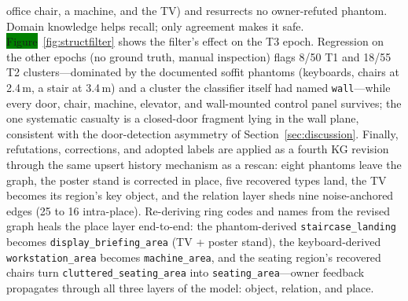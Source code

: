 \documentclass[electronics,article,accept,pdftex,moreauthors]{Definitions/mdpi}
\begin{document}
office chair, a machine, and the TV) and resurrects no owner-refuted
phantom. Domain knowledge helps recall; only agreement makes it safe.
\colorbox{green}{Figure}~\ref{fig:structfilter} shows the filter's effect on the T3 epoch.
Regression on the other epochs (no ground truth, manual inspection)
flags 8/50 T1 and 18/55 T2 clusters---dominated by the documented
soffit phantoms (keyboards, chairs at 2.4\,m, a stair at 3.4\,m) and a
cluster the classifier itself had named \texttt{wall}---while every
door, chair, machine, elevator, and wall-mounted control panel survives;
the one systematic casualty is a closed-door fragment lying in the wall
plane, consistent with the door-detection asymmetry of
Section~\ref{sec:discussion}. Finally, refutations, corrections, and
adopted labels are applied as a fourth KG revision through the same
upsert history mechanism as a rescan: eight phantoms leave the graph,
the poster stand is corrected in place, five recovered types land, the
TV becomes its region's key object, and the relation layer sheds nine
noise-anchored edges (25 to 16 intra-place). Re-deriving ring codes and
names from the revised graph heals the place layer end-to-end: the
phantom-derived \texttt{staircase\_landing} becomes
\texttt{display\_briefing\_area} (TV + poster stand), the
keyboard-derived \texttt{workstation\_area} becomes
\texttt{machine\_area}, and the seating region's recovered chairs turn
\texttt{cluttered\_seating\_area} into \texttt{seating\_area}---owner feedback propagates through all three layers of the model: object,
relation, and place.
\end{document}
